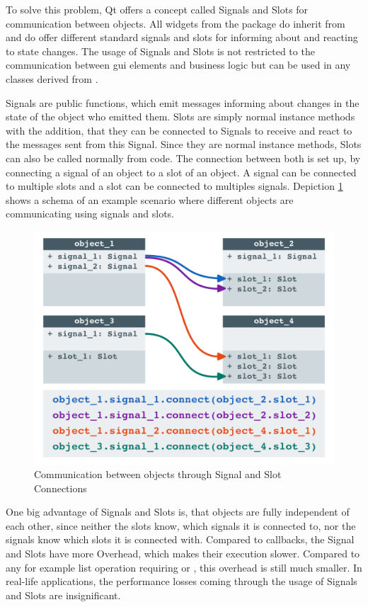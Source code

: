 To solve this problem, Qt offers a concept called Signals and Slots for
communication between objects. All widgets from the package
 do inherit from
 and do offer different standard signals and
slots for informing about and reacting to state changes. The usage of Signals
and Slots is not restricted to the communication between \gls{gui} elements and
business logic but can be used in any classes derived from
.

Signals are public functions, which emit messages informing about changes in the
state of the object who emitted them. Slots are simply normal instance methods
with the addition, that they can be connected to Signals to receive and react to
the messages sent from this Signal. Since they are normal instance methods,
Slots can also be called normally from code. The connection between both is set
up, by connecting a signal of an object to a slot of an object. A signal can be
connected to multiple slots and a slot can be connected to multiples signals.
Depiction \ref{fig:qt:signalsslots} shows a schema of an example scenario where
different objects are communicating using signals and slots.

\begin{figure}[h]
    \centering
    \includegraphics[width=12cm]{resources/img/QtSignalsSlots}
    \caption{Communication between objects through Signal and Slot Connections}
    \label{fig:qt:signalsslots}
\end{figure}

One big advantage of Signals and Slots is, that objects are fully independent
of each other, since neither the slots know, which signals it is connected
to, nor the signals know which slots it is connected with. Compared to
callbacks, the Signal and Slots have more Overhead, which makes their execution
slower. Compared to any for example list operation requiring
 or , this overhead is still much
smaller. In real-life applications, the performance losses coming through the
usage of Signals and Slots are insignificant. 
\cite{QtSignalsAndSlots, PythonGui1}

